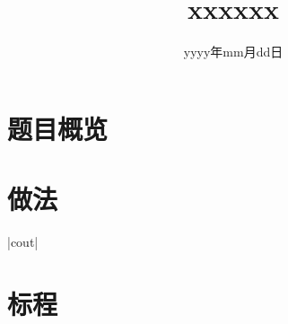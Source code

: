 \documentclass{ctsol}
\title{xxxxxx}
\date{yyyy年mm月dd日}
\begin{document}
\MakeShortVerb{|}

\maketitle
{}

\section*{题目概览}
\solutiontab

\makesolution
\section*{做法}
|cout|

\section*{标程}
\end{document}
